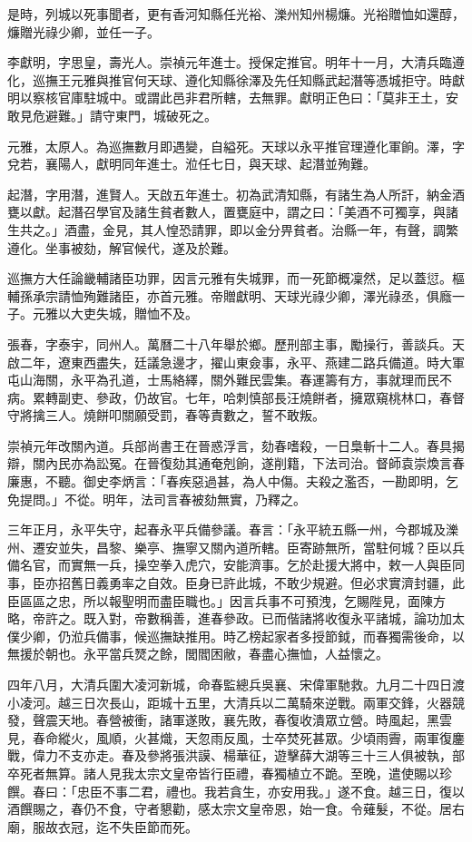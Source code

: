 \begin{pinyinscope}
是時，列城以死事聞者，更有香河知縣任光裕、濼州知州楊燫。光裕贈恤如還醇，燫贈光祿少卿，並任一子。

李獻明，字思皇，壽光人。崇禎元年進士。授保定推官。明年十一月，大清兵臨遵化，巡撫王元雅與推官何天球、遵化知縣徐澤及先任知縣武起潛等憑城拒守。時獻明以察核官庫駐城中。或謂此邑非君所轄，去無罪。獻明正色曰：「莫非王土，安敢見危避難。」請守東門，城破死之。

元雅，太原人。為巡撫數月即遇變，自縊死。天球以永平推官理遵化軍餉。澤，字兌若，襄陽人，獻明同年進士。涖任七日，與天球、起潛並殉難。

起潛，字用潛，進賢人。天啟五年進士。初為武清知縣，有諸生為人所訐，納金酒甕以獻。起潛召學官及諸生貧者數人，置甕庭中，謂之曰：「美酒不可獨享，與諸生共之。」酒盡，金見，其人惶恐請罪，即以金分畀貧者。治縣一年，有聲，調繁遵化。坐事被劾，解官候代，遂及於難。

巡撫方大任論畿輔諸臣功罪，因言元雅有失城罪，而一死節概凜然，足以蓋愆。樞輔孫承宗請恤殉難諸臣，亦首元雅。帝贈獻明、天球光祿少卿，澤光祿丞，俱廕一子。元雅以大吏失城，贈恤不及。

張春，字泰宇，同州人。萬曆二十八年舉於鄉。歷刑部主事，勵操行，善談兵。天啟二年，遼東西盡失，廷議急邊才，擢山東僉事，永平、燕建二路兵備道。時大軍屯山海關，永平為孔道，士馬絡繹，關外難民雲集。春運籌有方，事就理而民不病。累轉副吏、參政，仍故官。七年，哈刺慎部長汪燒餅者，擁眾窺桃林口，春督守將擒三人。燒餅叩關願受罰，春等責數之，誓不敢叛。

崇禎元年改關內道。兵部尚書王在晉惑浮言，劾春嗜殺，一日梟斬十二人。春具揭辯，關內民亦為訟冤。在晉復劾其通奄剋餉，遂削籍，下法司治。督師袁崇煥言春廉惠，不聽。御史李炳言：「春疾惡過甚，為人中傷。夫殺之濫否，一勘即明，乞免提問。」不從。明年，法司言春被劾無實，乃釋之。

三年正月，永平失守，起春永平兵備參議。春言：「永平統五縣一州，今郡城及濼州、遷安並失，昌黎、樂亭、撫寧又關內道所轄。臣寄跡無所，當駐何城？臣以兵備名官，而實無一兵，操空拳入虎穴，安能濟事。乞於赴援大將中，敕一人與臣同事，臣亦招舊日義勇率之自效。臣身已許此城，不敢少規避。但必求實濟封疆，此臣區區之忠，所以報聖明而盡臣職也。」因言兵事不可預洩，乞賜陛見，面陳方略，帝許之。既入對，帝數稱善，進春參政。已而偕諸將收復永平諸城，論功加太僕少卿，仍涖兵備事，候巡撫缺推用。時乙榜起家者多授節鉞，而春獨需後命，以無援於朝也。永平當兵燹之餘，閭閻困敝，春盡心撫恤，人益懷之。

四年八月，大清兵圍大凌河新城，命春監總兵吳襄、宋偉軍馳救。九月二十四日渡小凌河。越三日次長山，距城十五里，大清兵以二萬騎來逆戰。兩軍交鋒，火器競發，聲震天地。春營被衝，諸軍遂敗，襄先敗，春復收潰眾立營。時風起，黑雲見，春命縱火，風順，火甚熾，天忽雨反風，士卒焚死甚眾。少頃雨霽，兩軍復鏖戰，偉力不支亦走。春及參將張洪謨、楊華征，遊擊薛大湖等三十三人俱被執，部卒死者無算。諸人見我太宗文皇帝皆行臣禮，春獨植立不跪。至晚，遣使賜以珍饌。春曰：「忠臣不事二君，禮也。我若貪生，亦安用我。」遂不食。越三日，復以酒饌賜之，春仍不食，守者懇勸，感太宗文皇帝恩，始一食。令薙髮，不從。居右廟，服故衣冠，迄不失臣節而死。


\end{pinyinscope}
